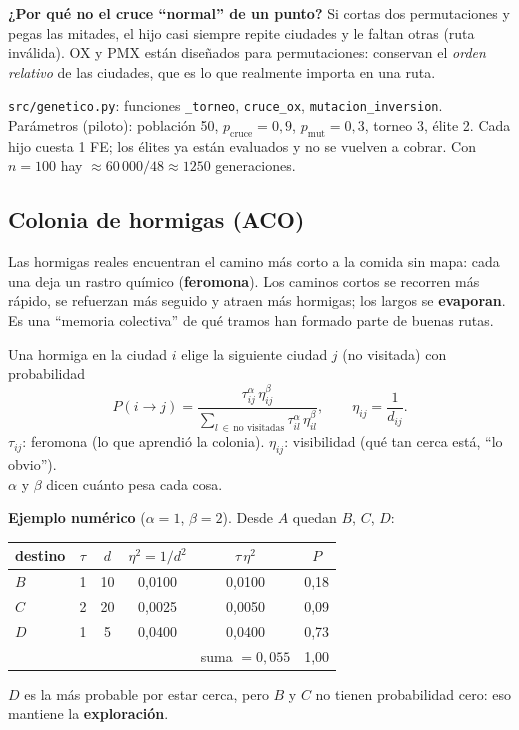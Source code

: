 \documentclass[11pt,a4paper]{article}
\newcommand{\archivo}[1]{\texttt{#1}}
\begin{document}
\begin{porque}
\textbf{¿Por qué no el cruce ``normal'' de un punto?} Si cortas dos permutaciones y pegas las mitades, el hijo casi siempre repite ciudades
y le faltan otras (ruta inválida). OX y PMX están diseñados para permutaciones: conservan el \emph{orden relativo} de las ciudades,
que es lo que realmente importa en una ruta.
\end{porque}

\begin{codigo}
\archivo{src/genetico.py}: funciones \texttt{\_torneo}, \texttt{cruce\_ox}, \texttt{mutacion\_inversion}. Parámetros
(piloto): población 50, $p_{\text{cruce}}=0{,}9$, $p_{\text{mut}}=0{,}3$, torneo 3, élite 2.
Cada hijo cuesta 1 FE; los élites ya están evaluados y no se vuelven a cobrar. Con $n=100$ hay $\approx 60\,000/48\approx1250$ generaciones.
\end{codigo}

\subsection{Colonia de hormigas (ACO)}
\begin{idea}
Las hormigas reales encuentran el camino más corto a la comida sin mapa: cada una deja un rastro químico (\textbf{feromona}).
Los caminos cortos se recorren más rápido, se refuerzan más seguido y atraen más hormigas; los largos se \textbf{evaporan}.
Es una ``memoria colectiva'' de qué tramos han formado parte de buenas rutas.
\end{idea}

\begin{mate}
Una hormiga en la ciudad $i$ elige la siguiente ciudad $j$ (no visitada) con probabilidad
\[
P(i\to j)=\frac{\tau_{ij}^{\alpha}\,\eta_{ij}^{\beta}}{\sum_{l\,\in\,\text{no visitadas}}\tau_{il}^{\alpha}\,\eta_{il}^{\beta}},
\qquad \eta_{ij}=\frac{1}{d_{ij}}.
\]
$\tau_{ij}$: feromona (lo que aprendió la colonia). \quad $\eta_{ij}$: visibilidad (qué tan cerca está, ``lo obvio'').\\
$\alpha$ y $\beta$ dicen cuánto pesa cada cosa.
\end{mate}

\textbf{Ejemplo numérico} ($\alpha=1$, $\beta=2$). Desde $A$ quedan $B$, $C$, $D$:
\begin{center}
\begin{tabular}{lccccc}
\toprule
destino & $\tau$ & $d$ & $\eta^2=1/d^2$ & $\tau\,\eta^2$ & $P$ \\
\midrule
$B$ & 1 & 10 & 0{,}0100 & 0{,}0100 & 0{,}18\\
$C$ & 2 & 20 & 0{,}0025 & 0{,}0050 & 0{,}09\\
$D$ & 1 & 5  & 0{,}0400 & 0{,}0400 & 0{,}73\\
\midrule
 & & & & suma $=0{,}055$ & 1{,}00\\
\bottomrule
\end{tabular}
\end{center}
$D$ es la más probable por estar cerca, pero $B$ y $C$ no tienen probabilidad cero: eso mantiene la \textbf{exploración}.
\end{document}
